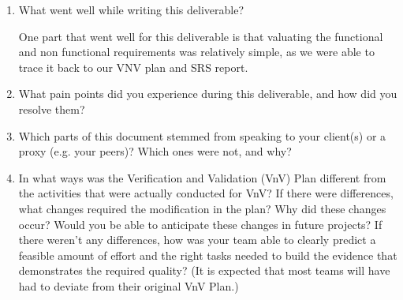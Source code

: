 \documentclass[12pt, titlepage]{article}
\begin{document}
\begin{enumerate}
  \item What went well while writing this deliverable? 

  One part that went well for this deliverable is that valuating the functional and non functional requirements was relatively simple, as we were able to trace it back to our VNV plan and SRS report.
  \item What pain points did you experience during this deliverable, and how
    did you resolve them?
  \item Which parts of this document stemmed from speaking to your client(s) or
  a proxy (e.g. your peers)? Which ones were not, and why?
  \item In what ways was the Verification and Validation (VnV) Plan different
  from the activities that were actually conducted for VnV?  If there were
  differences, what changes required the modification in the plan?  Why did
  these changes occur?  Would you be able to anticipate these changes in future
  projects?  If there weren't any differences, how was your team able to clearly
  predict a feasible amount of effort and the right tasks needed to build the
  evidence that demonstrates the required quality?  (It is expected that most
  teams will have had to deviate from their original VnV Plan.)
\end{enumerate}
\end{document}
